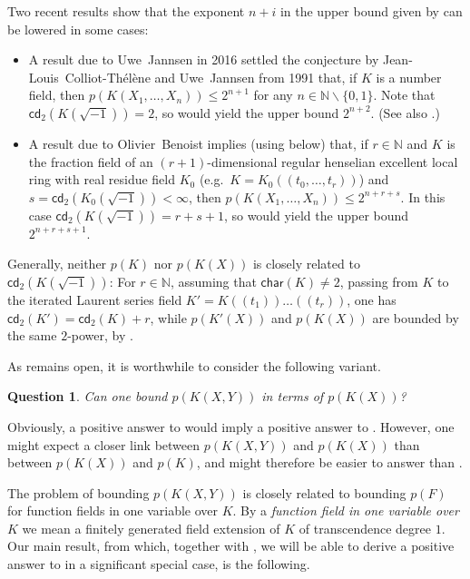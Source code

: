 \documentclass[12pt,leqno]{amsart}
\newcommand{\nat}{\mathbb{N}}
\renewcommand{\setminus}{\smallsetminus}
\newcommand{\car}{\mathsf{char}}
\renewcommand{\leq}{\leqslant}
\newcommand{\ctd}{\mathsf{cd}_2}
\numberwithin{equation}{section}
\newtheorem{qu}[equation]{Question}
\theoremstyle{definition}
\theoremstyle{plain}
\begin{document}
Two recent results show that the exponent $n+i$ in the upper bound given by  can be lowered in some cases:
\begin{itemize}    
    \item A result due to Uwe~Jannsen \cite[Corollary~0.7]{Jan16} in 2016 settled the conjecture by Jean-Louis~Colliot-Th\'el\`ene and Uwe~Jannsen from 1991 that, if $K$ is a number field, then $p(K(X_1,\dots,X_n))\leq 2^{n+1}$ for any $n\in\nat\setminus\{0,1\}$. Note that $\ctd(K(\sqrt{-1})) = 2$, so  would yield the upper bound $2^{n+2}$. (See also \cite[Sect.~5]{Pfi00}.)
    \item A result due to Olivier~Benoist \cite[Theorem 0.2]{Ben20} implies (using  below) that, if $r\in\nat$ and $K$ is the fraction field of an $(r+1)$-dimensional regular henselian 
    excellent local ring
    with real residue field $K_0$ (e.g.~$K=K_0(\!(t_0,\dots,t_r)\!)$) and $s = \ctd(K_0(\sqrt{-1}))<\infty$, then 
    $p(K(X_1,\dots,X_n))\leq 2^{n+r+s}$. In this case $\ctd(K(\sqrt{-1})) = r+s+1$, so  would yield the upper bound $2^{n+r+s+1}$.
\end{itemize}

Generally, neither $p(K)$ nor $p(K(X))$ is closely related to $\ctd(K(\sqrt{-1}))$:  
For $r\in\nat$, assuming that $\car(K)\neq 2$, passing from $K$ to the iterated Laurent series field 
$K'=K(\!(t_1)\!)\dots (\!(t_r)\!)$, one has $\ctd(K')=\ctd(K)+r$,
while $p(K'(X))$ and $p(K(X))$ are bounded by the same $2$-power, by \cite[Theorem 4.14]{BGVG14}.

As  remains open, it is worthwhile to consider the following variant.

\begin{qu}
\label{Q-main2}
Can one bound $p(K(X,Y))$ in terms of $p(K(X))$?
\end{qu}

Obviously, a positive answer to  would imply a positive answer to .
However, one might expect a closer link between $p(K(X,Y))$ and $p(K(X))$ than between $p(K(X))$ and $p(K)$, and  might therefore be easier to answer than .


The problem of bounding $p(K(X,Y))$ is closely related to bounding $p(F)$ for function fields in one variable over $K$.
By a \emph{function field in one variable over $K$} we mean a finitely generated field extension of $K$ of transcendence degree $1$.
Our main result, from which, together with , we will be able to derive a positive answer to  in a significant special case, is the following.
\end{document}
